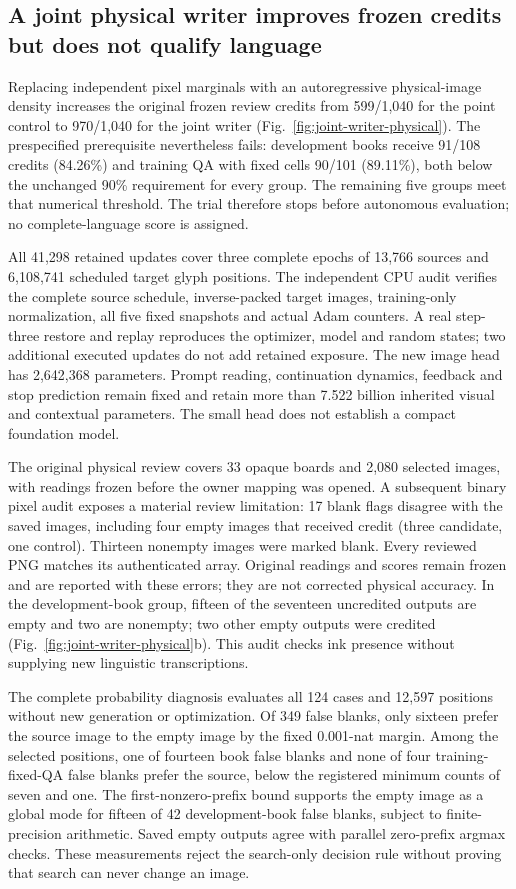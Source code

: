 \subsection*{A joint physical writer improves frozen credits but does not qualify language}

Replacing independent pixel marginals with an autoregressive physical-image
density increases the original frozen review credits from 599/1,040 for the
point control to 970/1,040 for the joint writer (Fig.~\ref{fig:joint-writer-physical}).
The prespecified prerequisite nevertheless fails: development books receive
91/108 credits (84.26\%) and training QA with fixed cells 90/101 (89.11\%), both
below the unchanged 90\% requirement for every group. The remaining five groups
meet that numerical threshold. The trial therefore stops before autonomous
evaluation; no complete-language score is assigned.

All 41,298 retained updates cover three complete epochs of 13,766 sources and
6,108,741 scheduled target glyph positions. The independent CPU audit verifies
the complete source schedule, inverse-packed target images, training-only
normalization, all five fixed snapshots and actual Adam counters. A real
step-three restore and replay reproduces the optimizer, model and random states;
two additional executed updates do not add retained exposure. The new image
head has 2,642,368 parameters. Prompt reading, continuation dynamics, feedback
and stop prediction remain fixed and retain more than 7.522 billion inherited
visual and contextual parameters. The small head does not establish a compact
foundation model.

The original physical review covers 33 opaque boards and 2,080 selected images,
with readings frozen before the owner mapping was opened. A subsequent binary
pixel audit exposes a material review limitation: 17 blank flags disagree with
the saved images, including four empty images that received credit (three
candidate, one control). Thirteen nonempty images were marked blank. Every
reviewed PNG matches its authenticated array. Original readings and scores
remain frozen and are reported with these errors; they are not corrected
physical accuracy. In the development-book group, fifteen of the seventeen
uncredited outputs are empty and two are nonempty; two other empty outputs were
credited (Fig.~\ref{fig:joint-writer-physical}b). This audit checks ink presence
without supplying new linguistic transcriptions.

The complete probability diagnosis evaluates all 124 cases and 12,597 positions
without new generation or optimization. Of 349 false blanks, only sixteen
prefer the source image to the empty image by the fixed 0.001-nat margin. Among
the selected positions, one of fourteen book false blanks and none of four
training-fixed-QA false blanks prefer the source, below the registered minimum
counts of seven and one. The first-nonzero-prefix bound supports the empty image
as a global mode for fifteen of 42 development-book false blanks, subject to
finite-precision arithmetic. Saved empty outputs agree with parallel zero-prefix
argmax checks. These measurements reject the search-only decision rule without
proving that search can never change an image.

